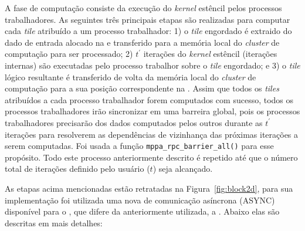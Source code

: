 A fase de computação consiste da execução do \emph{kernel} estêncil pelos processos trabalhadores. As seguintes três principais etapas são realizadas para computar cada \emph{tile} atribuído a um processo trabalhador: 1) o \emph{tile} engordado é extraido do dado de entrada alocado na \lpddr e transferido para a memória local do \emph{cluster} de computação para ser processado; 2) $t^\prime$ iterações do \emph{kernel} estêncil (iterações internas) são executadas pelo processo trabalhor sobre o \emph{tile} engordado; e 3) o \emph{tile} lógico resultante é transferido de volta da memória local do \emph{cluster} de computação para a sua posição correspondente na \lpddr. Assim que todos os \emph{tiles} atribuídos a cada processo trabalhador forem computados com sucesso, todos os processos trabalhadores irão sincronizar em uma barreira global, pois os processos trabalhadores precisarão dos dados computados pelos outros durante as $t^\prime$ iterações para resolverem as dependências de vizinhança das próximas iterações a serem computadas. 
Foi usada a função \texttt{mppa\_rpc\_barrier\_all()} para esse propósito. Todo este processo anteriormente descrito é repetido até que o número total de iterações definido pelo usuário ($t$) seja alcançado.

As etapas acima mencionadas estão retratadas na Figura~\ref{fig:block2d}, para sua implementação foi utilizada uma nova \api de comunicação asíncrona (ASYNC) disponível para o \mppa, que difere da \api anteriormente utilizada, a \ipc. Abaixo elas são descritas em mais detalhes:

